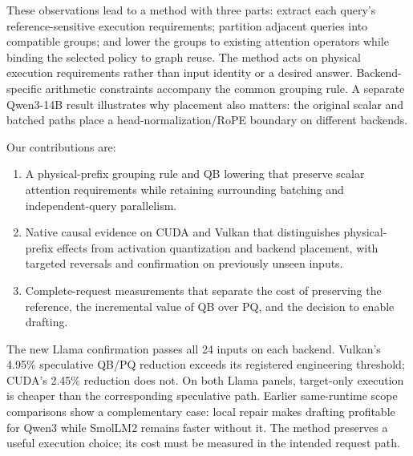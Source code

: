 These observations lead to a method with three parts: extract each query's reference-sensitive execution requirements; partition adjacent queries into compatible groups; and lower the groups to existing attention operators while binding the selected policy to graph reuse. The method acts on physical execution requirements rather than input identity or a desired answer. Backend-specific arithmetic constraints accompany the common grouping rule. A separate Qwen3-14B result illustrates why placement also matters: the original scalar and batched paths place a head-normalization/RoPE boundary on different backends.

Our contributions are:
\begin{enumerate}[label=(\arabic*),itemsep=2pt]
\item A physical-prefix grouping rule and QB lowering that preserve scalar attention requirements while retaining surrounding batching and independent-query parallelism.
\item Native causal evidence on CUDA and Vulkan that distinguishes physical-prefix effects from activation quantization and backend placement, with targeted reversals and confirmation on previously unseen inputs.
\item Complete-request measurements that separate the cost of preserving the reference, the incremental value of QB over PQ, and the decision to enable drafting.
\end{enumerate}

The new Llama confirmation passes all 24 inputs on each backend. Vulkan's 4.95\% speculative QB/PQ reduction exceeds its registered engineering threshold; CUDA's 2.45\% reduction does not. On both Llama panels, target-only execution is cheaper than the corresponding speculative path. Earlier same-runtime scope comparisons show a complementary case: local repair makes drafting profitable for Qwen3 while SmolLM2 remains faster without it. The method preserves a useful execution choice; its cost must be measured in the intended request path.
